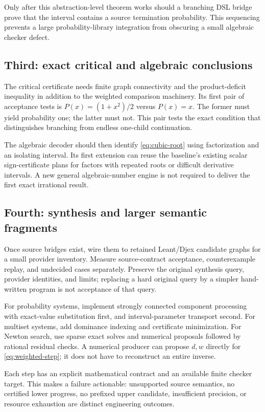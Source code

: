 Only after this abstraction-level theorem works should a branching DSL bridge prove that the interval contains a source termination probability. This sequencing prevents a large probability-library integration from obscuring a small algebraic checker defect.

\subsection{Third: exact critical and algebraic conclusions}
The critical certificate needs finite graph connectivity and the product-deficit inequality in addition to the weighted comparison machinery. Its first pair of acceptance tests is $P(x)=(1+x^2)/2$ versus $P(x)=x$. The former must yield probability one; the latter must not. This pair tests the exact condition that distinguishes branching from endless one-child continuation.

The algebraic decoder should then identify \eqref{eq:cubic-root} using factorization and an isolating interval. Its first extension can reuse the baseline's existing scalar sign-certificate plans for factors with repeated roots or difficult derivative intervals. A new general algebraic-number engine is not required to deliver the first exact irrational result.

\subsection{Fourth: synthesis and larger semantic fragments}
Once source bridges exist, wire them to retained Leant/Djex candidate graphs for a small provider inventory. Measure source-contract acceptance, counterexample replay, and undecided cases separately. Preserve the original synthesis query, provider identities, and limits; replacing a hard original query by a simpler hand-written program is not acceptance of that query.

For probability systems, implement strongly connected component processing with exact-value substitution first, and interval-parameter transport second. For multiset systems, add dominance indexing and certificate minimization. For Newton search, use sparse exact solves and numerical proposals followed by rational residual checks. A numerical producer can propose $d,w$ directly for \eqref{eq:weighted-step}; it does not have to reconstruct an entire inverse.

Each step has an explicit mathematical contract and an available finite checker target. This makes a failure actionable: unsupported source semantics, no certified lower progress, no prefixed upper candidate, insufficient precision, or resource exhaustion are distinct engineering outcomes.

